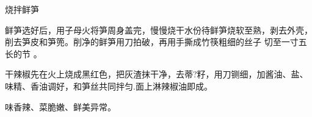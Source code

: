 \begin{recipe}{烧拌鲜笋}

\ingredients


\cooking

\step 鲜笋选好后，用子母火将笋周身盖完，慢慢烧干水份待鲜笋烧软至熟，剥去外壳，
削去笋皮和笋篼。削净的鲜笋用刀拍破，再用手撕成竹筷粗细的丝子 切至一寸五长的节
。

\step 干辣椒先在火上烧成黑红色，把灰渣抹干净，去蒂?籽，用刀铡细，加酱油、盐、
味精、香油调好，和笋丝共同拌匀.面上淋辣椒油即成。

\notes

味香辣、菜脆嫩、鲜美异常。

\end{recipe}

